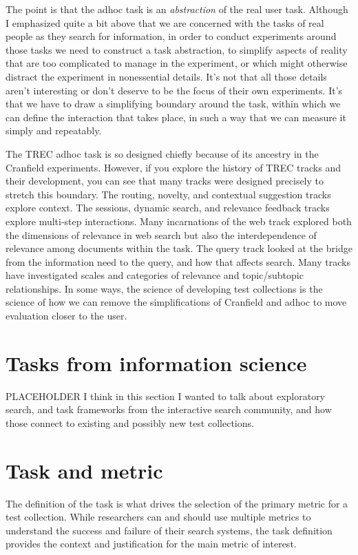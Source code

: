 \documentclass[nobib]{tufte-book}
\begin{document}
The point is that the adhoc task is an {\em abstraction} of the real user task.  Although I emphasized quite a bit above that we are concerned with the tasks of real people as they search for information, in order to conduct experiments around those tasks we need to construct a task abstraction, to simplify aspects of reality that are too complicated to manage in the experiment, or which might otherwise distract the experiment in nonessential details.  It's not that all those details aren't interesting or don't deserve to be the focus of their own experiments.  It's that we have to draw a simplifying boundary around the task, within which we can define the interaction that takes place, in such a way that we can measure it simply and repeatably.

The TREC adhoc task is so designed chiefly because of its ancestry in the Cranfield experiments. However, if you explore the history of TREC tracks and their development, you can see that many tracks were designed precisely to stretch this boundary.  The routing, novelty, and contextual suggestion tracks explore context.  The sessions, dynamic search, and relevance feedback tracks explore multi-step interactions.  Many incarnations of the web track explored both the dimensions of relevance in web search but also the interdependence of relevance among documents within the task.  The query track looked at the bridge from the information need to the query, and how that affects search.  Many tracks have investigated scales and categories of relevance and topic/subtopic relationships.  In some ways, the science of developing test collections is the science of how we can remove the simplifications of Cranfield and adhoc to move evaluation closer to the user.

\section{Tasks from information science}

PLACEHOLDER I think in this section I wanted to talk about exploratory search, and task frameworks from the interactive search community, and how those connect to existing and possibly new test collections.

\section{Task and metric}

The definition of the task is what drives the selection of the primary metric for a test collection.  While researchers can and should use multiple metrics to understand the success and failure of their search systems, the task definition provides the context and justification for the main metric of interest.
\end{document}
